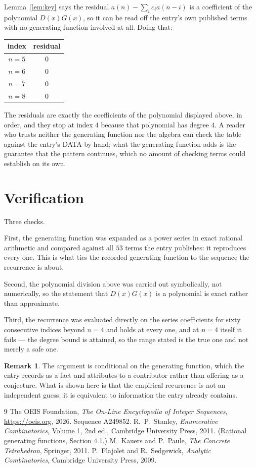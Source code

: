 \documentclass[11pt,a4paper]{article}
\theoremstyle{plain}
\theoremstyle{definition}
\newtheorem{remark}[theorem]{Remark}
\begin{document}
Lemma~\ref{lem:key} says the residual $a(n)-\sum_ic_ia(n-i)$ is a coefficient of the
polynomial $D(x)G(x)$, so it can be read off the entry's own published terms with no
generating function involved at all. Doing that:
\begin{center}
\begin{tabular}{cc}
index & residual \\ \hline
$n=5$ & $0$ \\
$n=6$ & $0$ \\
$n=7$ & $0$ \\
$n=8$ & $0$
\end{tabular}
\end{center}
The residuals are exactly the coefficients of the polynomial displayed above, in order, and
they stop at index $4$ because that polynomial has degree $4$. A reader who trusts
neither the generating function nor the algebra can check the table against the entry's DATA
by hand; what the generating function adds is the guarantee that the pattern continues, which
no amount of checking terms could establish on its own.

\section{Verification}

Three checks.

First, the generating function was expanded as a power series in exact rational arithmetic and
compared against all $53$ terms the entry publishes: it reproduces every one. This is
what ties the recorded generating function to the sequence the recurrence is about.

Second, the polynomial division above was carried out symbolically, not numerically, so the
statement that $D(x)G(x)$ is a polynomial is exact rather than approximate.

Third, the recurrence was evaluated directly on the series coefficients for sixty consecutive
indices beyond $n=4$ and holds at every one, and at $n=4$ itself it fails --- the
degree bound is attained, so the range stated is the true one and not merely a safe one.

\begin{remark}
The argument is conditional on the generating function, which the entry records as a fact and
attributes to a contributor rather than offering as a conjecture. What is shown here is that
the empirical recurrence is not an independent guess: it is equivalent to information the
entry already contains.
\end{remark}

\begin{thebibliography}{9}
 The OEIS Foundation, \emph{The On-Line Encyclopedia of Integer
Sequences}, \url{https://oeis.org}, 2026. Sequence A249852.
 R.~P.~Stanley, \emph{Enumerative Combinatorics}, Volume 1, 2nd ed.,
Cambridge University Press, 2011. (Rational generating functions, Section 4.1.)
 M.~Kauers and P.~Paule, \emph{The Concrete Tetrahedron}, Springer, 2011.
 P.~Flajolet and R.~Sedgewick, \emph{Analytic Combinatorics}, Cambridge
University Press, 2009.
\end{thebibliography}
\end{document}
